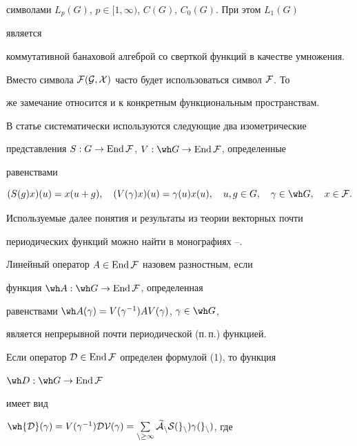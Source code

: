 символами $L_p(G)$, $p\in[1,\infty)$, $C(G)$, $C_0(G)$. При этом $L_1(G)$ 


является 


коммутативной банаховой алгеброй со сверткой функций в качестве умножения. 


 


Вместо символа $\cal F(G,X)$ часто будет использоваться символ $\cal F$. То 


же замечание относится и к конкретным функциональным пространствам. 


 


В статье систематически используются следующие два изометрические 


представления $S:G\to\operatorname{End}\cal F$, $V:\wh G\to\End\cal F$, определенные 


равенствами 


$$ 


(S(g)x)(u)=x(u+g),\quad (V(\gamma)x)(u)=\gamma(u)x(u),\quad 


u,g\in G,\quad \gamma\in\wh G,\quad x\in\cal F. 


$$ 


Используемые далее понятия и результаты из теории векторных почти 


периодических функций можно найти в монографиях \cite{Lev}--\cite{Dun}.


 


\begin{defn} Линейный оператор $A\in\operatorname{End}\cal F$ назовем разностным, если 


функция $\wh A:\wh G\to\End\cal F$, определенная 


равенствами $\wh A(\gamma)=V(\gamma^{-1})AV(\gamma)$, $\gamma\in\wh G$, 


является непрерывной почти периодической (п.\,п.) функцией. 


\end{defn} 


 


Если оператор $\cal D\in\operatorname{End}\cal F$ определен формулой (1), то функция 


$\wh D:\wh G\to\End\cal F$ 


имеет вид 


$\wh{\cal D}(\gamma)=V(\gamma^{-1})\cal D V(\gamma)=


\sum\limits_{n\ge 1}\widetilde A_nS(g_n)\gamma(g_n)$, где 


